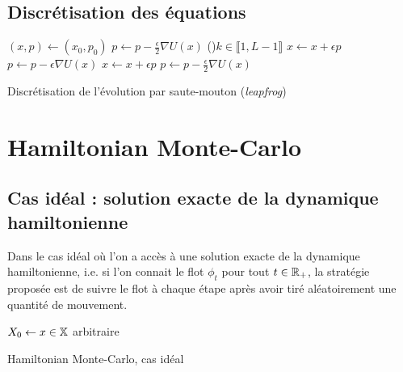 \documentclass[10pt,a4paper]{article}
\begin{document}
\subsection{Discrétisation des équations}



\begin{center}
\begin{algorithm}[H]
  $(x,p) \leftarrow (x_0,p_0)$\;
  $p \leftarrow p - \frac{\epsilon}{2} \nabla U(x)$ 
  \For(){$k \in \llbracket 1,L-1 \rrbracket$}{
    $x \leftarrow x + \epsilon p$\;
    $p \leftarrow p - \epsilon \nabla U(x)$\;
  }
  $x \leftarrow x + \epsilon p$ 
  $p \leftarrow p - \frac{\epsilon}{2} \nabla U(x)$ 
  \caption{Discrétisation de l'évolution par saute-mouton (\emph{leapfrog})}
  \label{algo:leapfrog}
\end{algorithm}
\end{center}

\section{Hamiltonian Monte-Carlo}

\subsection{Cas idéal : solution exacte de la dynamique hamiltonienne}
Dans le cas idéal où l'on a accès à une solution exacte de la dynamique hamiltonienne, i.e. si l'on connait le flot $\phi_t$ pour tout $t \in \mathbb{R}_+$, la stratégie proposée est de suivre le flot à chaque étape après avoir tiré aléatoirement une quantité de mouvement.

\begin{center}
\begin{algorithm}[H]
  $X_0 \leftarrow x \in \mathbb{X}$ arbitraire\;
  \caption{Hamiltonian Monte-Carlo, cas idéal}
  \label{algo:HMC-ideal}
\end{algorithm}
\end{center}
\end{document}

